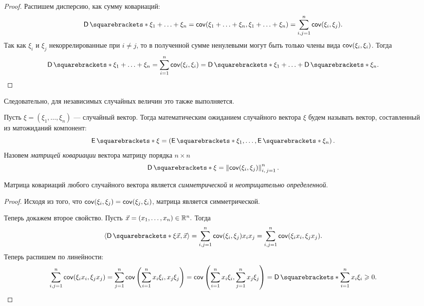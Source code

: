 \begin{proof}
	Распишем дисперсию, как сумму ковариаций:
	\[
	\D{\xi_1 + \ldots + \xi_n} = \cov(\xi_1 + \ldots + \xi_n, \xi_1 + \ldots + 
	\xi_n) = \sum\limits_{i, j = 1}^{n}\cov(\xi_i, \xi_j).
	\]
	Так как \(\xi_i\) и \(\xi_j\) некоррелированные при \(i \neq j\), то в 
	полученной сумме ненулевыми могут быть только члены вида \(\operatorname{\mathsf{cov}}(\xi_i, 
	\xi_i)\). Тогда
	\[
	\D{\xi_1 + \ldots + \xi_n} = \sum\limits_{i = 1}^{n}\cov(\xi_i, \xi_i) = 
	\D{\xi_1} + \ldots + \D{\xi_n}.\qedhere
	\]
\end{proof}
Следовательно, для независимых случайных величин это также выполняется.
		
\begin{definition}
	Пусть \(\xi = (\xi_1,\ldots,\xi_n)\) --- случайный вектор. Тогда 
	математическим ожиданием случайного вектора \(\xi\) будем называть вектор, 
	составленный из матожиданий компонент: \[\E{\xi} = \left(\E{\xi_1}, \ldots, 
	\E{\xi_n} \right). \] Назовем \emph{матрицей ковариации} вектора матрицу 
	порядка \(n \times n\) 
	\[
	\D{\xi} = \left\lVert\cov(\xi_i, \xi_j)\right\rVert_{i,\,j = 1}^{n}.
	\]
\end{definition}
		
\begin{point}
	Матрица ковариаций любого случайного вектора является \emph{симметрической} 
	и \emph{неотрицательно определенной}.
\end{point}
\begin{proof}
	Исходя из того, что \(\operatorname{\mathsf{cov}}(\xi_i, \xi_j) = \operatorname{\mathsf{cov}}(\xi_j, \xi_i) \), матрица 
	является симметрической.
	
	Теперь докажем второе свойство. Пусть \(\vec{x} = (x_1,\ldots,x_n) \in 
	\mathbb{R}^n. \) Тогда \[\langle\D{\xi}\vec{x}, \vec{x}\rangle = \sum\limits_{i, j 
	= 1}^{n}\cov(\xi_i, \xi_j)x_ix_j = \sum\limits_{i, j = 1}^{n}\cov(\xi_ix_i, 
	\xi_jx_j).  \] Теперь распишем по линейности:
	\[\sum\limits_{i, j = 1}^{n} \cov(\xi_{i}x_{i}, \xi_{j}x_{j}) = 
	\sum\limits_{j = 1}^{n} \cov\left(\sum\limits_{i = 1}^{n} x_{i}\xi_{i}, 
	x_{j}\xi_{j}\right) = 
	\cov\left(\sum\limits_{i=1}^{n}x_i\xi_i,\sum\limits_{j=1}^{n} 
	x_j\xi_j\right) = \D{\sum\limits_{i=1}^{n}x_i\xi_i} \geq 0. \]
\end{proof}